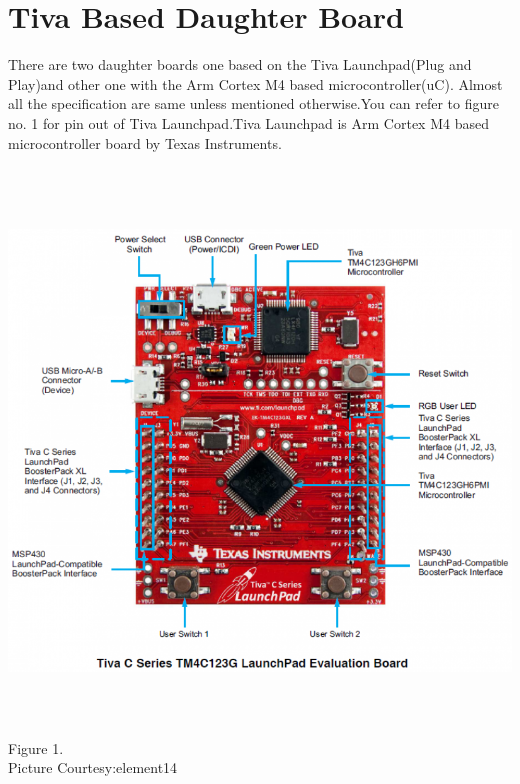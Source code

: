 \documentclass[a4paper,10pt,oneside]{article}
\begin{document}
{	\section{\textbf{Tiva Based Daughter Board}}
		{There are two daughter boards one based on the Tiva Launchpad(Plug and Play)and other one with the Arm Cortex M4 based microcontroller(uC). Almost all the specification are same unless mentioned otherwise.You can refer to figure no. 1 for pin out of Tiva Launchpad.Tiva Launchpad is Arm Cortex M4 based microcontroller board by Texas Instruments.\\}
		\begin{center}
			\includegraphics[height=15cm]{Images/TivaLaunchPad}\\
			Figure 1.\\
			Picture Courtesy:element14
		\end{center}
}
\end{document}
